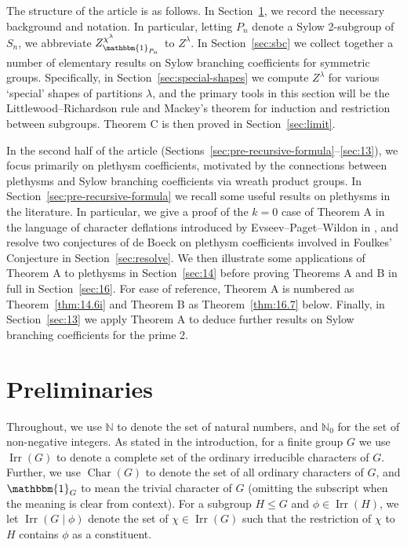 \documentclass[ALCO, Unicode]{cedram}
\newcommand{\triv}{\mathbbm{1}}
\newcommand{\Ch}{\operatorname{Char}}
\newcommand{\Irr}{\operatorname{Irr}}
\newcommand{\N}{\mathbb{N}}
\begin{document}
The structure of the article is as follows. In Section~\ref{sec:prelims}, we record the necessary background and notation. In particular, letting $P_n$ denote a Sylow 2-subgroup of $S_n$, we abbreviate $Z^{\chi^\lambda}_{\triv_{P_n}}$ to $Z^\lambda$.
In Section~\ref{sec:sbc} we collect together a number of elementary results on Sylow branching coefficients for symmetric groups. Specifically, in Section~\ref{sec:special-shapes} we compute $Z^\lambda$ for various `special' shapes of partitions $\lambda$, and the primary tools in this section will be the Littlewood--Richardson rule and Mackey's theorem for induction and restriction between subgroups. Theorem C is then proved in Section~\ref{sec:limit}.

In the second half of the article (Sections~\ref{sec:pre-recursive-formula}--\ref{sec:13}), we focus primarily on plethysm coefficients, motivated by the connections between plethysms and Sylow branching coefficients via wreath product groups. In Section~\ref{sec:pre-recursive-formula} we recall some useful results on plethysms in the literature. In particular, we give a proof of the $k=0$ case of Theorem A in the language of character deflations introduced by Evseev--Paget--Wildon in \cite{EPW}, and resolve two conjectures of de Boeck on plethysm coefficients involved in Foulkes' Conjecture in Section~\ref{sec:resolve}. We then illustrate some applications of Theorem A to plethysms in Section~\ref{sec:14} before proving Theorems A and B in full in Section~\ref{sec:16}. For ease of reference, Theorem A is numbered as Theorem~\ref{thm:14.6i} and Theorem B as Theorem~\ref{thm:16.7} below. Finally, in Section~\ref{sec:13} we apply Theorem A to deduce further results on Sylow branching coefficients for the prime 2.



\section{Preliminaries}\label{sec:prelims}
Throughout, we use $\N$ to denote the set of natural numbers, and $\N_0$ for the set of non-negative integers. 
As stated in the introduction, for a finite group $G$ we use $\Irr(G)$ to denote a complete set of the ordinary irreducible characters of $G$. Further, we use $\Ch(G)$ to denote the set of all ordinary characters of $G$, and $\triv_G$ to mean the trivial character of $G$ (omitting the subscript when the meaning is clear from context).
For a subgroup $H\le G$ and $\phi\in\Irr(H)$, we let $\Irr(G\mid \phi)$ denote the set of $\chi\in\Irr(G)$ such that the restriction of $\chi$ to $H$ contains $\phi$ as a constituent. 
\end{document}
